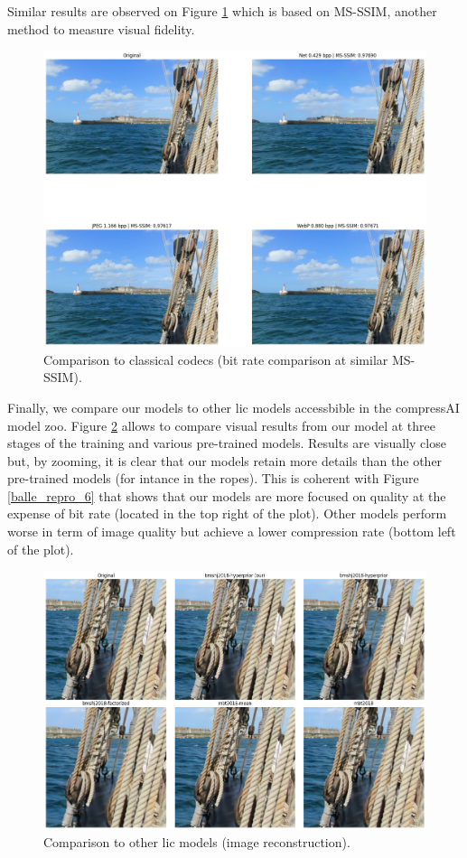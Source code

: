 Similar results are observed on Figure \ref{balle_repro_4} which is based on MS-SSIM, another method to measure visual fidelity.

\begin{figure}
    \centering
    \includegraphics[width=15cm]{img/balle_repro_4.png}
    \caption{Comparison to classical codecs (bit rate comparison at similar MS-SSIM).}
    \label{balle_repro_4}
\end{figure}

Finally, we compare our models to other \acrshort{lic} models accessbible in the compressAI model zoo. Figure \ref{balle_repro_5} allows to compare visual results from our model at three stages of the training and various pre-trained models. Results are visually close but, by zooming, it is clear that our models retain more details than the other pre-trained models (for intance in the ropes). This is coherent with Figure \ref{balle_repro_6} that shows that our models are more focused on quality at the expense of bit rate (located in the top right of the plot). Other models perform worse in term of image quality but achieve a lower compression rate (bottom left of the plot).

\begin{figure}
    \centering
    \includegraphics[width=15cm]{img/balle_repro_5.png}
    \caption{Comparison to other \acrshort{lic} models (image reconstruction).}
    \label{balle_repro_5}
\end{figure}

